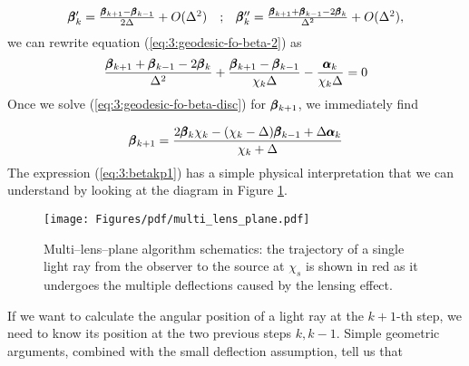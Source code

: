 \begin{equation}
\label{eq:3:finitediff}
\begin{matrix}
\pmb{\beta}'_k = \frac{\pmb{\beta}_{k+1}-\pmb{\beta}_{k-1}}{2\Delta} + O(\Delta^2) & ; & \pmb{\beta}''_k = \frac{\pmb{\beta}_{k+1}+\pmb{\beta}_{k-1}-2\pmb{\beta}_k}{\Delta^2} + O(\Delta^2),
\end{matrix}
\end{equation}
%
we can rewrite equation (\ref{eq:3:geodesic-fo-beta-2}) as 
\begin{equation}
\label{eq:3:geodesic-fo-beta-disc}
\frac{\pmb{\beta}_{k+1}+\pmb{\beta}_{k-1}-2\pmb{\beta}_k}{\Delta^2} + \frac{\pmb{\beta}_{k+1}-\pmb{\beta}_{k-1}}{\chi_k\Delta} - \frac{\pmb{\alpha}_k}{\chi_k\Delta} = 0
\end{equation} 
%
Once we solve (\ref{eq:3:geodesic-fo-beta-disc}) for $\pmb{\beta}_{k+1}$, we immediately find

\begin{equation}
\label{eq:3:betakp1}
\pmb{\beta}_{k+1} = \frac{2\pmb{\beta}_k\chi_k-(\chi_k-\Delta)\pmb{\beta}_{k-1}+\Delta\pmb{\alpha}_k}{\chi_k+\Delta}
\end{equation}  
%
The expression (\ref{eq:3:betakp1}) has a simple physical interpretation that we can understand by looking at the diagram in Figure \ref{fig:3:multi-lens-plane}.
\begin{figure}
\begin{center}
\texttt{[image: Figures/pdf/multi\_lens\_plane.pdf]}
\end{center}
\caption{Multi--lens--plane algorithm schematics: the trajectory of a single light ray from the observer to the source at $\chi_s$ is shown in red as it undergoes the multiple deflections caused by the lensing effect.}
\label{fig:3:multi-lens-plane}
\end{figure}
%
If we want to calculate the angular position of a light ray at the $k+1$-th step, we need to know its position at the two previous steps $k,k-1$. Simple geometric arguments, combined with the small deflection assumption, tell us that 

